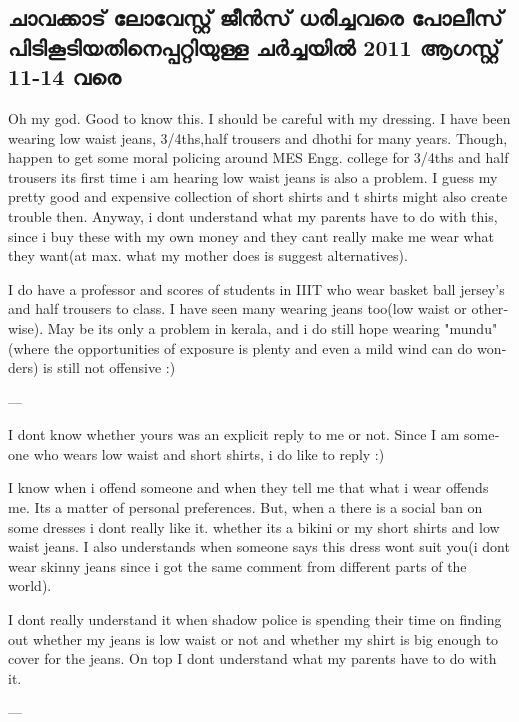 \subsection*{ചാവക്കാട്  ലോവേസ്റ്റ് ജീന്‍സ് ധരിച്ചവരെ പോലീസ് പിടികൂടിയതിനെപ്പറ്റിയുള്ള ചര്‍ച്ചയില്‍  2011 ആഗസ്റ്റ് 11-14 വരെ }
\begin{english}

Oh my god. Good to know this. I should be careful with my dressing.
I have been wearing low waist jeans, 3/4ths,half trousers and dhothi
for many years. Though, happen to get some moral policing around MES
Engg. college for 3/4ths and half trousers its first time i am hearing
low waist jeans is also a problem. I guess my pretty good and
expensive collection of short shirts and t shirts might also create
trouble then. Anyway, i dont understand what my parents have to do
with this, since i buy these with my own money and they cant really
make me wear what they want(at max. what my mother does is suggest
alternatives).

I do have a professor and scores of students in IIIT who wear basket
ball jersey's and half trousers to class. I have seen many wearing
jeans too(low waist or otherwise). May be its only a problem in
kerala, and i do still hope wearing "mundu" (where the opportunities
of exposure is plenty and even a mild wind can do wonders) is still
not offensive :)

---

I dont know whether yours was an explicit reply to me or not. Since I
am someone who wears low waist and short shirts, i do like to reply :)

I know when i offend someone and when they tell me that what i wear
offends me. Its a matter of personal preferences. But, when a there is
a social ban on some dresses i dont really like it. whether its a
bikini or my short shirts and low waist jeans. I also understands when
someone says this dress wont suit you(i dont wear skinny jeans since i
got the same comment from different parts of the world).

I dont really understand it when shadow police is spending their time
on finding out whether my jeans is low waist or not and whether my
shirt is big enough to cover for the jeans. On top I dont understand
what my parents have to do with it.

---


\end{english}
